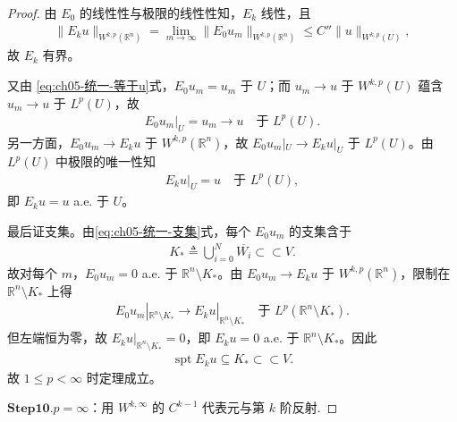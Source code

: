 \documentclass[../../main.tex]{subfiles}
\begin{document}
\begin{proof}
由 $E_0$ 的线性性与极限的线性性知，$E_k$ 线性，且
\begin{align*}
\|E_ku\|_{W^{k,p}(\mathbb{R}^{n})}
=\lim_{m\to\infty}\|E_0u_m\|_{W^{k,p}(\mathbb{R}^{n})}
\leqslant C''\|u\|_{W^{k,p}(U)},
\end{align*}
故 $E_k$ 有界。

又由 \eqref{eq:ch05-统一-等于u}式，$E_0u_m=u_m$ 于 $U$；而 $u_m\to u$ 于 $W^{k,p}(U)$ 蕴含 $u_m\to u$ 于 $L^{p}(U)$，故
\begin{align*}
E_0u_m|_{U}=u_m\longrightarrow u\quad\text{于 }L^{p}(U).
\end{align*}
另一方面，$E_0u_m\to E_ku$ 于 $W^{k,p}(\mathbb{R}^{n})$，故 $E_0u_m|_{U}\to E_ku|_{U}$ 于 $L^{p}(U)$。由 $L^{p}(U)$ 中极限的唯一性知
\begin{align*}
E_ku|_U=u\quad\text{于 }L^{p}(U),
\end{align*}
即 $E_ku=u$ a.e. 于 $U$。

最后证支集。由\eqref{eq:ch05-统一-支集}式，每个 $E_0u_m$ 的支集含于
\begin{align*}
K_*\triangleq\bigcup_{i=0}^{N}\overline{W_i}\subset\subset V.
\end{align*}
故对每个 $m$，$E_0u_m=0$ a.e. 于 $\mathbb{R}^{n}\setminus K_*$。由 $E_0u_m\to E_ku$ 于 $W^{k,p}(\mathbb{R}^{n})$，限制在 $\mathbb{R}^{n}\setminus K_*$ 上得
\begin{align*}
E_0u_m|_{\mathbb{R}^{n}\setminus K_*}\longrightarrow E_ku|_{\mathbb{R}^{n}\setminus K_*}\quad\text{于 }L^{p}(\mathbb{R}^{n}\setminus K_*).
\end{align*}
但左端恒为零，故 $E_ku|_{\mathbb{R}^{n}\setminus K_*}=0$，即 $E_ku=0$ a.e. 于 $\mathbb{R}^{n}\setminus K_*$。因此
\begin{align*}
\operatorname{spt}E_ku\subseteq K_*\subset\subset V.
\end{align*}
故 $1\leqslant p<\infty$ 时定理成立。

\noindent$\mathbf{Step}\bm{10}$.{\heiti $p=\infty$：用 $W^{k,\infty}$ 的 $C^{k-1}$ 代表元与第 $k$ 阶反射.}


\end{proof}
\end{document}
